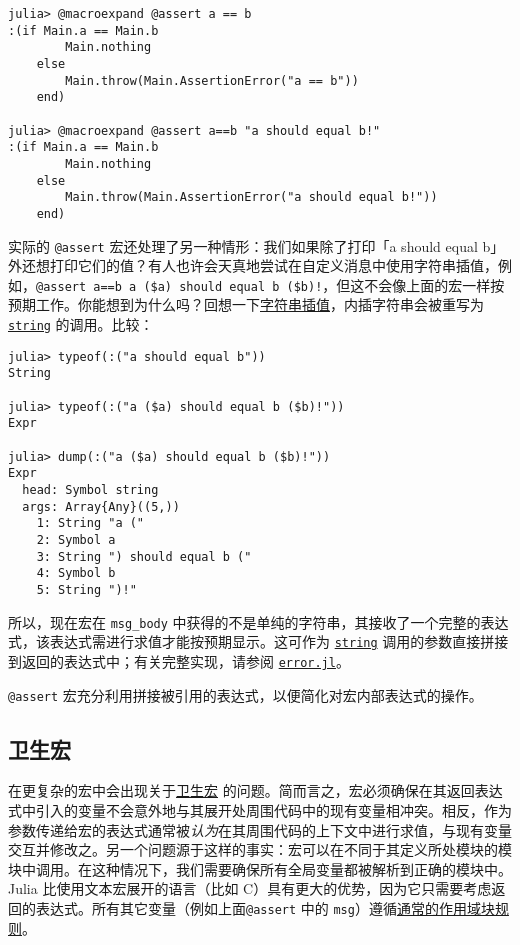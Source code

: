 \begin{lstlisting}
julia> @macroexpand @assert a == b
:(if Main.a == Main.b
        Main.nothing
    else
        Main.throw(Main.AssertionError("a == b"))
    end)

julia> @macroexpand @assert a==b "a should equal b!"
:(if Main.a == Main.b
        Main.nothing
    else
        Main.throw(Main.AssertionError("a should equal b!"))
    end)
\end{lstlisting}



实际的 \texttt{@assert} 宏还处理了另一种情形：我们如果除了打印「a should equal b」外还想打印它们的值？有人也许会天真地尝试在自定义消息中使用字符串插值，例如，\texttt{@assert a==b {\textquotedbl}a (\$a) should equal b (\$b)!{\textquotedbl}}，但这不会像上面的宏一样按预期工作。你能想到为什么吗？回想一下\hyperlink{4452850363638134205}{字符串插值}，内插字符串会被重写为 \hyperlink{7919678712989769360}{\texttt{string}} 的调用。比较：




\begin{verbatim}
julia> typeof(:("a should equal b"))
String

julia> typeof(:("a ($a) should equal b ($b)!"))
Expr

julia> dump(:("a ($a) should equal b ($b)!"))
Expr
  head: Symbol string
  args: Array{Any}((5,))
    1: String "a ("
    2: Symbol a
    3: String ") should equal b ("
    4: Symbol b
    5: String ")!"
\end{verbatim}



所以，现在宏在 \texttt{msg\_body} 中获得的不是单纯的字符串，其接收了一个完整的表达式，该表达式需进行求值才能按预期显示。这可作为 \hyperlink{7919678712989769360}{\texttt{string}} 调用的参数直接拼接到返回的表达式中；有关完整实现，请参阅 \href{https://github.com/JuliaLang/julia/blob/master/base/error.jl}{\texttt{error.jl}}。



\texttt{@assert} 宏充分利用拼接被引用的表达式，以便简化对宏内部表达式的操作。



\hypertarget{12123968542051578223}{}


\subsection{卫生宏}



在更复杂的宏中会出现关于\href{https://en.wikipedia.org/wiki/Hygienic\_macro}{卫生宏} 的问题。简而言之，宏必须确保在其返回表达式中引入的变量不会意外地与其展开处周围代码中的现有变量相冲突。相反，作为参数传递给宏的表达式通常被\emph{认为}在其周围代码的上下文中进行求值，与现有变量交互并修改之。另一个问题源于这样的事实：宏可以在不同于其定义所处模块的模块中调用。在这种情况下，我们需要确保所有全局变量都被解析到正确的模块中。Julia 比使用文本宏展开的语言（比如 C）具有更大的优势，因为它只需要考虑返回的表达式。所有其它变量（例如上面\texttt{@assert} 中的 \texttt{msg}）遵循\hyperlink{11957539949537805757}{通常的作用域块规则}。



